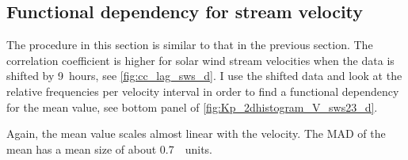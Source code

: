 \subsection{Functional dependency for stream velocity}
The procedure in this section is similar to that in the previous section. The correlation coefficient is higher for solar wind stream velocities when the data is shifted by 9~hours, see \autoref{fig:cc_lag_sws_d}.
I use the shifted data and look at the relative frequencies per velocity interval in order to find a functional dependency for the mean \Kp{} value, see bottom panel of \autoref{fig:Kp_2dhistogram_V_sws23_d}.
\begin{figure}
\end{figure}
Again, the mean \Kp{} value scales almost linear with the velocity. The MAD of the mean has a mean size of about \SI{0.7}{\Kp~units}.

